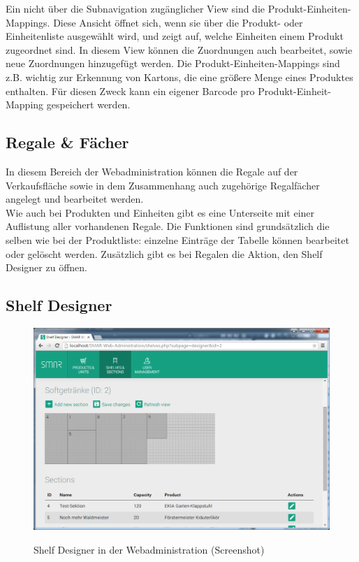 Ein nicht über die Subnavigation zugänglicher View sind die Produkt-Einheiten-Mappings. Diese Ansicht öffnet sich, wenn sie über die Produkt- oder Einheitenliste ausgewählt wird, und zeigt auf, welche Einheiten einem Produkt zugeordnet sind. In diesem View können die Zuordnungen auch bearbeitet, sowie neue Zuordnungen hinzugefügt werden. Die Produkt-Einheiten-Mappings sind z.B. wichtig zur Erkennung von Kartons, die eine größere Menge eines Produktes enthalten. Für diesen Zweck kann ein eigener Barcode pro Produkt-Einheit-Mapping gespeichert werden.


\subsection{Regale \& Fächer}

In diesem Bereich der Webadministration können die Regale auf der Verkaufsfläche sowie in dem Zusammenhang auch zugehörige Regalfächer angelegt und bearbeitet werden.\\

Wie auch bei Produkten und Einheiten gibt es eine Unterseite mit einer Auflistung aller vorhandenen Regale. Die Funktionen sind grundsätzlich die selben wie bei der Produktliste: einzelne Einträge der Tabelle können bearbeitet oder gelöscht werden. Zusätzlich gibt es bei Regalen die Aktion, den Shelf Designer zu öffnen.\\


\subsection{Shelf Designer}

\begin{figure}[H]
	\centering
	{\includegraphics[width=\textwidth]{Bilder/Abbildungen/webadmin_shelves_designer.png}}
	\caption{Shelf Designer in der Webadministration (Screenshot)}
	\label{fig:webadmin_shelves_designer}
\end{figure}

